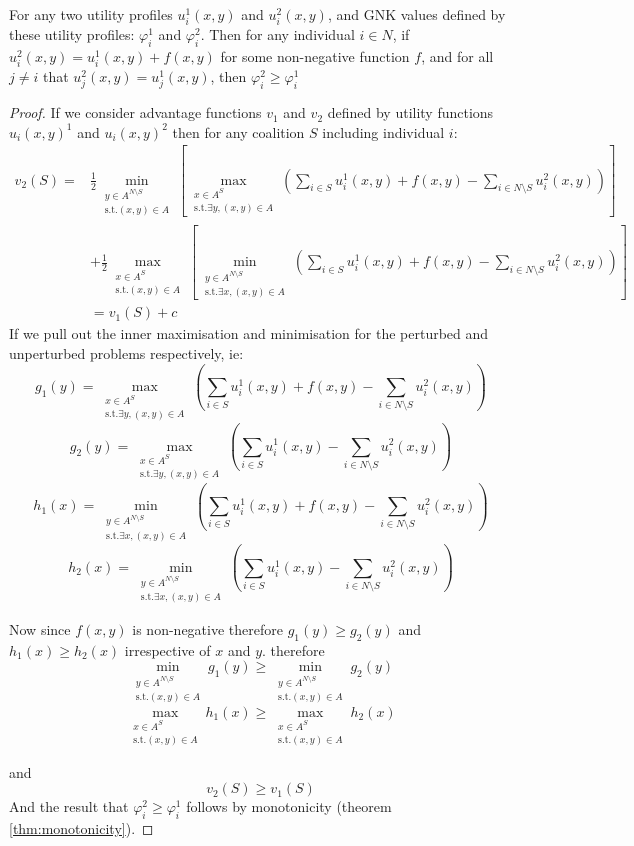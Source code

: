 \begin{theorem}
For any two utility profiles $u^1_i(x,y)$ and $u^2_i(x,y)$, and GNK values defined by these utility profiles: $\varphi_i^1$ and $\varphi_i^2$.
Then for any individual $i\in N$, if $u_i^2(x,y) = u_i^1(x,y)+f(x,y)$ for some non-negative function $f$, and for all $j\neq i$ that $u^2_j(x,y) = u^1_j(x,y)$, then $\varphi_i^2 \ge \varphi_i^1$ 
\end{theorem}
\begin{proof}
If we consider advantage functions $v_1$ and $v_2$ defined by utility functions $u_i(x,y)^1$ and $u_i(x,y)^2$ then for any coalition $S$ including individual $i$:
\begin{align}
v_2(S) = &
\frac{1}{2}\min_{\substack{y\in A^{N\setminus S} \\ \text{s.t.}(x,y)\in A}} \left[
\max_{\substack{x\in A^S \\ \text{s.t.}\exists y,(x,y)\in A}}
	\left(\sum_{i\in S} u^1_i(x,y)+f(x,y) - \sum_{i\in N\setminus S}u_i^2(x,y)\right)\right]\nonumber\\
& +
\frac{1}{2}\max_{\substack{x\in A^S \\ \text{s.t.}(x,y)\in A}} \left[
\min_{\substack{y\in A^{N\setminus S} \\ \text{s.t.}\exists x,(x,y)\in A}}
	\left(\sum_{i\in S} u^1_i(x,y)+f(x,y) - \sum_{i\in N\setminus S} u_i^2(x,y) \right) \right]\nonumber\\
&= v_1(S)+c\nonumber
\end{align}
If we pull out the inner maximisation and minimisation for the perturbed and unperturbed problems respectively, ie:
$$ g_1(y) = 
\max_{\substack{x\in A^S \\ \text{s.t.}\exists y,(x,y)\in A}}
	\left(\sum_{i\in S} u^1_i(x,y)+f(x,y) - \sum_{i\in N\setminus S}u_i^2(x,y)\right)
$$
$$g_2(y) = 
\max_{\substack{x\in A^S \\ \text{s.t.}\exists y,(x,y)\in A}}
	\left(\sum_{i\in S} u^1_i(x,y) - \sum_{i\in N\setminus S}u_i^2(x,y)\right) $$
$$h_1(x) = 
\min_{\substack{y\in A^{N\setminus S} \\ \text{s.t.}\exists x,(x,y)\in A}}
	\left(\sum_{i\in S} u^1_i(x,y)+f(x,y) - \sum_{i\in N\setminus S} u_i^2(x,y) \right)$$
$$h_2(x) = 
\min_{\substack{y\in A^{N\setminus S} \\ \text{s.t.}\exists x,(x,y)\in A}}
	\left(\sum_{i\in S} u^1_i(x,y) - \sum_{i\in N\setminus S} u_i^2(x,y) \right)$$

Now since $f(x,y)$ is non-negative therefore $g_1(y) \ge g_2(y)$ and $h_1(x) \ge h_2(x)$ irrespective of $x$ and $y$.
therefore
$$\min_{\substack{y\in A^{N\setminus S} \\ \text{s.t.}(x,y)\in A}}g_1(y) \ge \min_{\substack{y\in A^{N\setminus S} \\ \text{s.t.}(x,y)\in A}}g_2(y)$$
$$\max_{\substack{x\in A^S \\ \text{s.t.}(x,y)\in A}}h_1(x) \ge \max_{\substack{x\in A^S \\ \text{s.t.}(x,y)\in A}}h_2(x)$$

and $$v_2(S) \ge v_1(S)$$
And the result that $\varphi_i^2 \ge \varphi_i^1$ follows by monotonicity (theorem \ref{thm:monotonicity}).
\end{proof}
